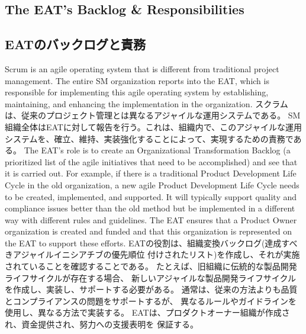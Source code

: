 \documentclass[12pt,a4paper,parskip=full]{scrartcl}
\begin{document}
\subsection{The EAT's Backlog \& Responsibilities}
\fi
\subsection{EATのバックログと責務}
Scrum is an agile operating system that is different from traditional
project management. The entire SM organization reports into the EAT, which
is responsible for implementing this agile operating system by
establishing, maintaining, and enhancing the implementation in the
organization.
\fi
スクラムは、従来のプロジェクト管理とは異なるアジャイルな運用システムである。
SM組織全体はEATに対して報告を行う。これは、組織内で、このアジャイルな運用
システムを、確立、維持、実装強化することによって、実現するための責務である。
The EAT's role is to create an Organizational Transformation Backlog (a
prioritized list of the agile initiatives that need to be accomplished) and
see that it is carried out. For example, if there is a traditional Product
Development Life Cycle in the old organization, a new agile Product
Development Life Cycle needs to be created, implemented, and supported. It
will typically support quality and compliance issues better than the old
method but be implemented in a different way with different rules and
guidelines. The EAT ensures that a Product Owner organization is created and funded
and that this organization is represented on the EAT to support these efforts.
\fi
EATの役割は、組織変換バックログ(達成すべきアジャイルイニシアチブの優先順位
付けされたリスト)を作成し、それが実施されていることを確認することである。
たとえば、旧組織に伝統的な製品開発ライフサイクルが存在する場合、
新しいアジャイルな製品開発ライフサイクルを作成し、実装し、サポートする必要がある。
通常は、従来の方法よりも品質とコンプライアンスの問題をサポートするが、
異なるルールやガイドラインを使用し、異なる方法で実装する。
EATは、プロダクトオーナー組織が作成され、資金提供され、努力への支援表明を
保証する。
\end{document}
